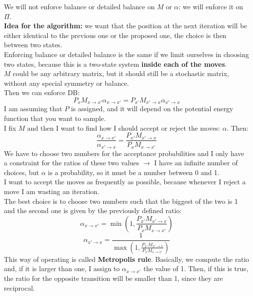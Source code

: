 We will not enforce balance or detailed balance on $M$ or $\alpha$: we will enforce it on $\Pi$.\\
\textbf{Idea for the algorithm:} we want that the position at the next iteration will be either identical to the previous one or the proposed one, the choice is then between two states.\\
Enforcing balance or detailed balance is the same if we limit ourselves in choosing two states, because this is a two-state system \textbf{inside each of the moves}.\\
$M$ could be any arbitrary matrix, but it should still be a stochastic matrix, without any special symmetry or balance.\\
Then we can enforce DB:
\[
P_xM_{x\rightarrow x'}\alpha_{x\rightarrow x'}=P_{x'}M_{x'\rightarrow x}\alpha_{x'\rightarrow x}
\]
I am assuming that $P$ is assigned, and it will depend on the potential energy function that you want to sample.\\
I fix $M$ and then I want to find how I should accept or reject the moves: $\alpha$.
Then: \[
\frac{\alpha_{x\rightarrow x'}}{\alpha_{x' \rightarrow x}} = \frac{P_{x'}M_{x'\rightarrow x}}{P_xM_{x\rightarrow x'}}
\]
We have to choose two numbers for the acceptance probabilities and I only have a constraint for the ratios of these two values $\rightarrow$ I have an infinite number of choices, but $\alpha$ is a probability, so it must be a number between 0 and 1.\\
I want to accept the moves as frequently as possible, because whenever I reject a move I am wasting an iteration.\\
The best choice is to choose two numbers such that the biggest of the two is 1 and the second one is given by the previously defined ratio:
\[
\alpha_{x\rightarrow x'} = \min\left(1, \frac{P_{x'}M_{x'\rightarrow x}}{P_xM_{x\rightarrow x'}}\right)
\]
\begin{equation*}
    \alpha_{x'\rightarrow x} =\frac{1}{\max\left(1, \frac{P_{x'}M_{x'\rightarrow x}}{P_xM_{x\rightarrow x'}}\right)}
\end{equation*}
This way of operating is called \textbf{Metropolis rule}.
Basically, we compute the ratio and, if it is larger than one, I assign to $\alpha_{x\rightarrow x'}$ the value of 1. Then, if this is true, the ratio for the opposite transition will be smaller than 1, since they are reciprocal.\\

